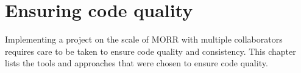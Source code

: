 \chapter{Ensuring code quality}

Implementing a project on the scale of MORR with multiple collaborators requires care to be taken to ensure code quality and consistency. This chapter lists the tools and approaches that were chosen to ensure code quality.